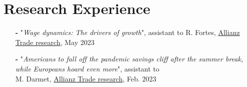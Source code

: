 \documentclass[letterpaper,10pt]{article}
\makeatletter
\newcommand{\up}[1]{\textsuperscript{#1}}
\newcommand{\resumeItem}[1]{
    \item\small{
            {#1 \vspace{-2pt}}
    }
}
\newcommand{\resumeSubheading}[4]{
    \vspace{-2pt}\item
    \begin{tabular*}{0.97\textwidth}[t]{l@{\extracolsep{\fill}}r}
        \textbf{#1}       & #2                 \\
        \textit{\small#3} & \textit{\small #4} \\
    \end{tabular*}\vspace{-7pt}
}
\newcommand{\resumeSubHeadingListStart}{\begin{itemize}[leftmargin=0.2in, label={}]}
\newcommand{\resumeSubHeadingListEnd}{\end{itemize}}
\newcommand{\resumeItemListStart}{\begin{itemize}}
\newcommand{\resumeItemListEnd}{\end{itemize}\vspace{-5pt}}
\makeatother
\begin{document}
\section{Research Experience}
\begin{itemize}
    \item[\textbf{-}] \small{"\textit{Wage dynamics: The drivers of growth}", assistant to R. Fortes, \textcolor{blue(pigment)}{\href{https://www.allianz.com/content/dam/onemarketing/azcom/Allianz_com/economic-research/publications/specials/en/2023/may/2023-05-03-LaborMarkets.pdf}{Allianz Trade research}}, May 2023}
    \item[\textbf{-}] \small{"\textit{Americans to fall off the pandemic savings cliff after the summer break, while Europeans hoard even more}", assistant to \\M. Darmet, \textcolor{blue(pigment)}{\href{https://www.allianz-trade.com/content/dam/onemarketing/aztrade/allianz-trade_com/en_gl/erd/publications/pdf/2023_02_02_excess_savings.pdf}{Allianz Trade research}}, Feb. 2023}

\end{itemize}


\end{document}
